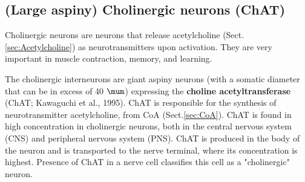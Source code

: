  
 
  
\subsection{(Large aspiny) Cholinergic neurons (ChAT)}
\label{sec:cholinergic_neurons}
\label{sec:ChAT-expressing-neuron}

Cholinergic neurons are neurons that release acetylcholine
(Sect.\ref{sec:Acetylcholine}) as neurotransmitters upon activation. They are
very important in muscle contraction, memory, and learning.

The cholinergic interneurons are giant aspiny neurons (with a somatic diameter
that can be in excess of 40 $\mum$) expressing the {\bf choline
acetyltransferase} (ChAT; Kawaguchi et al., 1995). ChAT is responsible for the
synthesis of neurotransmitter acetylcholine, from CoA (Sect.\ref{sec:CoA}).
 ChAT is found in high concentration in cholinergic neurons, both in the central
nervous system (CNS) and peripheral nervous system (PNS). ChAT is produced in
the body of the neuron and is transported to the nerve terminal, where its
concentration is highest. Presence of ChAT in a nerve cell classifies this cell
as a "cholinergic" neuron.




